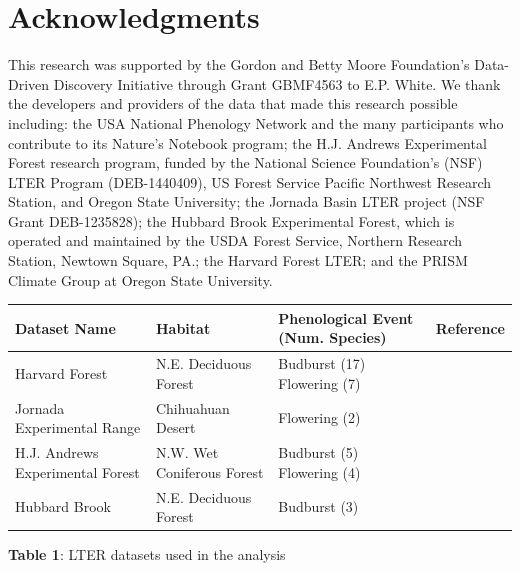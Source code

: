 \documentclass[fleqn,12pt,lineno]{article}
\begin{document}
\section*{Acknowledgments}

This research was supported by the Gordon and Betty Moore Foundation’s Data-Driven Discovery Initiative through Grant GBMF4563 to E.P. White. We thank the developers and providers of the data that made this research possible including: the USA National Phenology Network and the many participants who contribute to its Nature’s Notebook program; the H.J. Andrews Experimental Forest research program, funded by the National Science Foundation's (NSF) LTER Program (DEB-1440409), US Forest Service Pacific Northwest Research Station, and Oregon State University; the Jornada Basin LTER project (NSF Grant DEB-1235828); the Hubbard Brook Experimental Forest, which is operated and maintained by the USDA Forest Service, Northern Research Station, Newtown Square, PA.; the Harvard Forest LTER; and the PRISM Climate Group at Oregon State University.








\newpage

\begin{adjustbox}{angle=90}
    \begin{tabular}{ | l | l | l | l |}
    \hline
    Dataset Name & Habitat &  Phenological Event (Num. Species) & Reference \\ \hline
    Harvard Forest & N.E. Deciduous Forest & Budburst (17) Flowering (7) & \citep{okeefe2015} \\
    Jornada Experimental Range & Chihuahuan Desert & Flowering (2) &  \\
    H.J. Andrews Experimental Forest & N.W. Wet Coniferous Forest & Budburst (5) Flowering (4) & \citep{schulze2017} \\
    Hubbard Brook & N.E. Deciduous Forest & Budburst (3) & \citep{bailey2018} \\
    \hline
    \end{tabular}
\end{adjustbox} \newline
\textbf{Table 1}: LTER datasets used in the analysis
\end{document}
